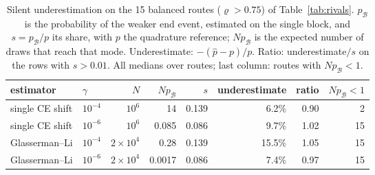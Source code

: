 \begin{table}[t]
\centering\small
\caption{Silent underestimation on the 15 balanced routes ($\varrho>0.75$) of
Table~\ref{tab:rivals}. $p_{\mathcal B}$ is the probability of the weaker end event,
estimated on the single block, and $s=p_{\mathcal B}/p$ its share, with $p$ the quadrature
reference; $Np_{\mathcal B}$ is the expected number of draws that reach that mode.
Underestimate: $-(\hat p-p)/p$. Ratio: underestimate$/s$ on the rows with $s>0.01$. All
medians over routes; last column: routes with $Np_{\mathcal B}<1$.}
\label{tab:bias}
\begin{tabular}{llrrrrrr}
\toprule
estimator & $\gamma$ & $N$ & $Np_{\mathcal B}$ & $s$ & underestimate & ratio & $Np_{\mathcal B}<1$ \\
\midrule
single CE shift & $10^{-4}$ & $10^6$ & 14 & 0.139 & 6.2\% & 0.90 & 2 \\
single CE shift & $10^{-6}$ & $10^6$ & 0.085 & 0.086 & 9.7\% & 1.02 & 15 \\
Glasserman--Li & $10^{-4}$ & $2\times10^4$ & 0.28 & 0.139 & 15.5\% & 1.05 & 15 \\
Glasserman--Li & $10^{-6}$ & $2\times10^4$ & 0.0017 & 0.086 & 7.4\% & 0.97 & 15 \\
\bottomrule
\end{tabular}
\end{table}
